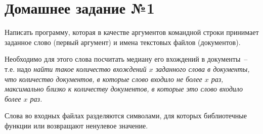 \section*{Домашнее задание №1}

Написать программу, которая в качестве аргументов командной строки
принимает заданное слово (первый аргумент) и имена текстовых файлов
(документов).

Необходимо для этого слова посчитать медиану его
вхождений в документы~-- т.е. надо \textit{найти такое количество вхождений $x$
заданного слова в документы, что количество документов, в которые слово
входило не более $x$ раз, максимально близко к количеству документов, в
которые это слово входило более $x$ раз.}

Слова во входных файлах разделяются символами, для которых
библиотечные функции  или  возвращают ненулевое
значение.
